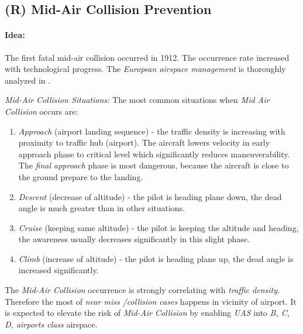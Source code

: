 \setcounter{chapter}{6}
\setcounter{section}{7}
\setcounter{subsection}{3}

\subsection{(R) Mid-Air Collision Prevention}\label{sec:MidairCollisionPrevention}
\paragraph{Idea:} The first fatal mid-air collision occurred in 1912. The occurrence rate increased with technological progress. The \emph{European airspace management} is thoroughly analyzed in \cite{cook2007european}. 

\emph{Mid-Air Collision Situations:} The most common situations when \emph{Mid Air Collision} occurs are:

\begin{enumerate}
    \item \emph{Approach} (airport landing sequence) - the traffic density is increasing with proximity to traffic hub (airport). The aircraft lowers velocity in early approach phase to critical level which significantly reduces maneuverability. The \emph{final approach} phase is most dangerous, because the aircraft is close to the ground prepare to the landing.  
    
    \item \emph{Descent} (decrease of altitude) - the pilot is heading plane down, the dead angle is much greater than in other situations.
    
    \item \emph{Cruise}  (keeping same altitude) - the pilot is  keeping the altitude and heading, the awareness usually decreases significantly in this slight phase. 

    \item \emph{Climb} (increase of altitude) - the pilot is heading plane up, the dead angle is increased significantly. 
\end{enumerate}

\begin{note}
    The \emph{Mid-Air Collision} occurrence is strongly correlating with \emph{traffic density}. Therefore the most of \emph{near miss /collision cases} happens in vicinity of airport. It is expected to elevate the risk of \emph{Mid-Air Collision} by enabling \emph{UAS} into \emph{B, C, D, airports class}  airspace.
\end{note}

